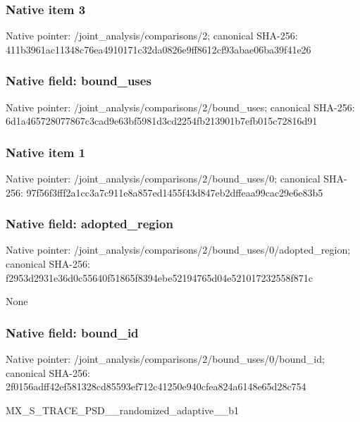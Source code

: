 \documentclass[10pt,a4paper]{article}
\begin{document}
\subsubsection{Native item 3}
Native pointer: /joint\_\allowbreak{}analysis/comparisons/2; canonical SHA-256: 411b3961ac11348c76ea4910171c32da0826e9ff8612cf93abae06ba39f41e26

\subsubsection{Native field: bound\_\allowbreak{}uses}
Native pointer: /joint\_\allowbreak{}analysis/comparisons/2/bound\_\allowbreak{}uses; canonical SHA-256: 6d1a465728077867c3cad9e63bf5981d3cd2254fb213901b7efb015c72816d91

\subsubsection{Native item 1}
Native pointer: /joint\_\allowbreak{}analysis/comparisons/2/bound\_\allowbreak{}uses/0; canonical SHA-256: 97f56f3fff2a1cc3a7c911e8a857ed1455f43d847eb2dffeaa99cac29e6e83b5

\subsubsection{Native field: adopted\_\allowbreak{}region}
Native pointer: /joint\_\allowbreak{}analysis/comparisons/2/bound\_\allowbreak{}uses/0/adopted\_\allowbreak{}region; canonical SHA-256: f2953d2931e36d0c55640f51865f8394ebe52194765d04e521017232558f871c

\begingroup\raggedright\sloppy None\par\endgroup

\subsubsection{Native field: bound\_\allowbreak{}id}
Native pointer: /joint\_\allowbreak{}analysis/comparisons/2/bound\_\allowbreak{}uses/0/bound\_\allowbreak{}id; canonical SHA-256: 2f0156adff42ef581328cd85593ef712c41250e940cfea824a6148e65d28c754

\begingroup\raggedright\sloppy MX\_\allowbreak{}S\_\allowbreak{}TRACE\_\allowbreak{}PSD\_\allowbreak{}\_\allowbreak{}randomized\_\allowbreak{}adaptive\_\allowbreak{}\_\allowbreak{}b1\par\endgroup
\end{document}

